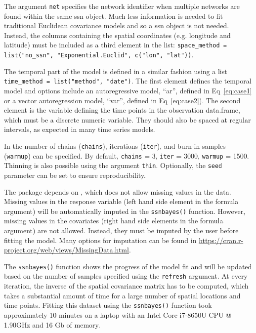     
The argument \texttt{net} specifies the network identifier when multiple networks are found within the same ssn object. 
Much less information is needed to fit traditional Euclidean covariance models and so a ssn object is not needed. Instead, the columns containing the spatial coordinates (e.g. longitude and latitude) must be included as a third element in the list: 
\texttt{space\_method = list("no\_ssn", "Exponential.Euclid", c("lon", "lat"))}. 

The temporal part of the model is defined in a similar fashion using a list \texttt{time\_method = list("method", "date")}. The first element defines the temporal model and options include an autoregressive model, ``ar'', defined in Eq~\ref{eq:case1} or a vector autoregression model, ``var'', defined in Eq~\ref{eq:case2}). The second element is the variable defining the time points in the observation data.frame, which must be a discrete numeric variable. They should also be spaced at regular intervals, as expected in many time series models. 

In  the number of chains (\texttt{chains}), iterations (\texttt{iter}), and burn-in samples (\texttt{warmup}) can be specified. 
By default, \texttt{chains} = 3, \texttt{iter} = 3000, \texttt{warmup} = 1500.
Thinning is also possible using the argument \texttt{thin}. Optionally, the \texttt{seed} parameter can be set to ensure reproducibility.

The  package depends on , which does not allow missing values in the data. Missing values in the response variable (left hand side element in the formula argument) will be automatically imputed in the \texttt{ssnbayes()} function. 
However, missing values in the covariates (right hand side elements in the formula argument) are not allowed. Instead, they must be imputed by the user before fitting the model. Many options for imputation can be found in \url{https://cran.r-project.org/web/views/MissingData.html}.

The \texttt{ssnbayes()} function shows the progress of the model fit and will be updated based on the number of samples specified using the \texttt{refresh} argument. At every iteration, the inverse of the spatial covariance matrix has to be computed, which takes a substantial amount of time for a 
large number of spatial locations and time points. Fitting this dataset using the \texttt{ssnbayes()} function took approximately 10 minutes on a laptop with an Intel Core i7-8650U CPU @ 1.90GHz and 16 Gb of memory.



